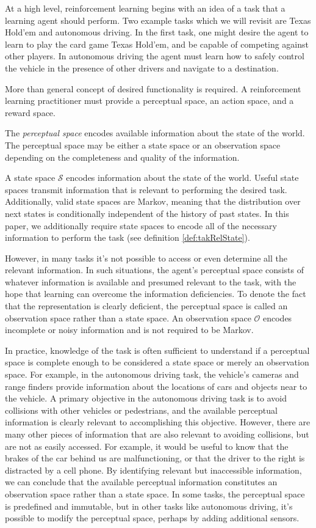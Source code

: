\documentclass{article} %
\theoremstyle{definition}
\begin{document}
At a high level, reinforcement learning begins with an idea of a task
that a learning agent should perform. Two example tasks which we will
revisit are Texas Hold'em and autonomous driving. In the first task,
one might desire the agent to learn to play the card game Texas
Hold'em, and be capable of competing against other players. In
autonomous driving the agent must learn how to safely control the
vehicle in the presence of other drivers and navigate to a
destination.

More than general concept of desired functionality is required. A
reinforcement learning practitioner must provide a perceptual space,
an action space, and a reward space.

The \textit{perceptual space} encodes available information about the
state of the world. The perceptual space may be either a state space
or an observation space depending on the completeness and quality of
the information.

A state space $\mathcal{S}$ encodes information about the state of the
world. Useful state spaces transmit information that is relevant to
performing the desired task. Additionally, valid state spaces are
Markov, meaning that the distribution over next states is
conditionally independent of the history of past states. In this
paper, we additionally require state spaces to encode all of the
necessary information to perform the task (see definition
\ref{def:takRelState}).

However, in many tasks it's not possible to access or even determine
all the relevant information. In such situations, the agent's
perceptual space consists of whatever information is available and
presumed relevant to the task, with the hope that learning can
overcome the information deficiencies. To denote the fact that the
representation is clearly deficient, the perceptual space is called an
observation space rather than a state space. An observation space
$\mathcal{O}$ encodes incomplete or noisy information and is not
required to be Markov.

In practice, knowledge of the task is often sufficient to understand
if a perceptual space is complete enough to be considered a state
space or merely an observation space. For example, in the autonomous
driving task, the vehicle's cameras and range finders provide
information about the locations of cars and objects near to the
vehicle. A primary objective in the autonomous driving task is to avoid
collisions with other vehicles or pedestrians, and the available
perceptual information is clearly relevant to accomplishing this
objective. However, there are many other pieces of information that
are also relevant to avoiding collisions, but are not as easily
accessed. For example, it would be useful to know that the brakes of
the car behind us are malfunctioning, or that the driver to the right
is distracted by a cell phone. By identifying relevant but
inaccessible information, we can conclude that the available perceptual
information constitutes an observation space rather than a state
space. In some tasks, the perceptual space is predefined and
immutable, but in other tasks like autonomous driving, it's possible
to modify the perceptual space, perhaps by adding additional sensors.
\end{document}
